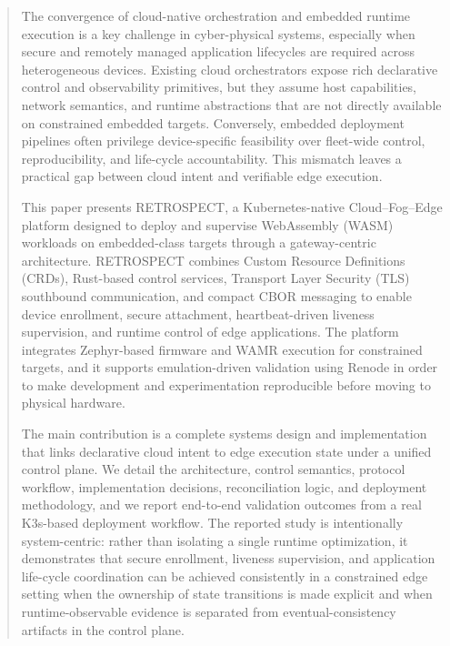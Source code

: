 \begin{abstract}
The convergence of cloud-native orchestration and embedded runtime execution is a key challenge in cyber-physical systems, especially when secure and remotely managed application lifecycles are required across heterogeneous devices. Existing cloud orchestrators expose rich declarative control and observability primitives, but they assume host capabilities, network semantics, and runtime abstractions that are not directly available on constrained embedded targets. Conversely, embedded deployment pipelines often privilege device-specific feasibility over fleet-wide control, reproducibility, and life-cycle accountability. This mismatch leaves a practical gap between cloud intent and verifiable edge execution.

This paper presents RETROSPECT, a Kubernetes-native Cloud--Fog--Edge platform designed to deploy and supervise WebAssembly (WASM) workloads on embedded-class targets through a gateway-centric architecture. RETROSPECT combines Custom Resource Definitions (CRDs), Rust-based control services, Transport Layer Security (TLS) southbound communication, and compact CBOR messaging to enable device enrollment, secure attachment, heartbeat-driven liveness supervision, and runtime control of edge applications. The platform integrates Zephyr-based firmware and WAMR execution for constrained targets, and it supports emulation-driven validation using Renode in order to make development and experimentation reproducible before moving to physical hardware.

The main contribution is a complete systems design and implementation that links declarative cloud intent to edge execution state under a unified control plane. We detail the architecture, control semantics, protocol workflow, implementation decisions, reconciliation logic, and deployment methodology, and we report end-to-end validation outcomes from a real K3s-based deployment workflow. The reported study is intentionally system-centric: rather than isolating a single runtime optimization, it demonstrates that secure enrollment, liveness supervision, and application life-cycle coordination can be achieved consistently in a constrained edge setting when the ownership of state transitions is made explicit and when runtime-observable evidence is separated from eventual-consistency artifacts in the control plane.


\end{abstract}
